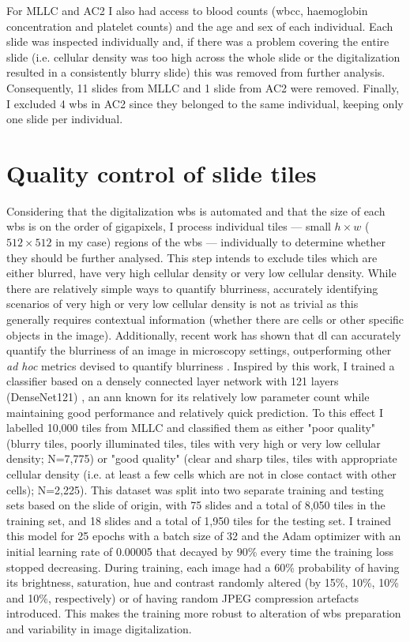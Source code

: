 For MLLC and AC2 I also had access to blood counts (\ac{wbcc}, haemoglobin concentration and platelet counts) and the age and sex of each individual. Each slide was inspected individually and, if there was a problem covering the entire slide (i.e. cellular density was too high across the whole slide or the digitalization resulted in a consistently blurry slide) this was removed from further analysis. Consequently, 11 slides from MLLC and 1 slide from AC2 were removed. Finally, I excluded 4 \ac{wbs} in AC2 since they belonged to the same individual, keeping only one slide per individual.

\section{Quality control of slide tiles}

Considering that the digitalization \ac{wbs} is automated and that the size of each \ac{wbs} is on the order of gigapixels, I process individual tiles --- small $h \times w$ ($512 \times 512$ in my case) regions of the \ac{wbs} --- individually to determine whether they should be further analysed. This step intends to exclude tiles which are either blurred, have very high cellular density or very low cellular density. While there are relatively simple ways to quantify blurriness, accurately identifying scenarios of very high or very low cellular density is not as trivial as this generally requires contextual information (whether there are cells or other specific objects in the image). Additionally, recent work has shown that \ac{dl} can accurately quantify the blurriness of an image in microscopy settings, outperforming other \textit{ad hoc} metrics devised to quantify blurriness \cite{Yang2018-ve}. Inspired by this work, I trained a classifier based on a densely connected layer network with 121 layers (DenseNet121) \cite{huang2017densely}, an \ac{ann} known for its relatively low parameter count while maintaining good performance and relatively quick prediction. To this effect I labelled 10,000 tiles from MLLC and classified them as either "poor quality" (blurry tiles, poorly illuminated tiles, tiles with very high or very low cellular density; N=7,775) or "good quality" (clear and sharp tiles, tiles with appropriate cellular density (i.e. at least a few cells which are not in close contact with other cells); N=2,225). This dataset was split into two separate training and testing sets based on the slide of origin, with 75 slides and a total of 8,050 tiles in the training set, and 18 slides and a total of 1,950 tiles for the testing set. I trained this model for 25 epochs with a batch size of 32 and the Adam optimizer with an initial learning rate of 0.00005 that decayed by 90\% every time the training loss stopped decreasing. During training, each image had a 60\% probability of having its brightness, saturation, hue and contrast randomly altered (by 15\%, 10\%, 10\% and 10\%, respectively) or of having random JPEG compression artefacts introduced. This makes the training more robust to alteration of \ac{wbs} preparation and variability in image digitalization.

